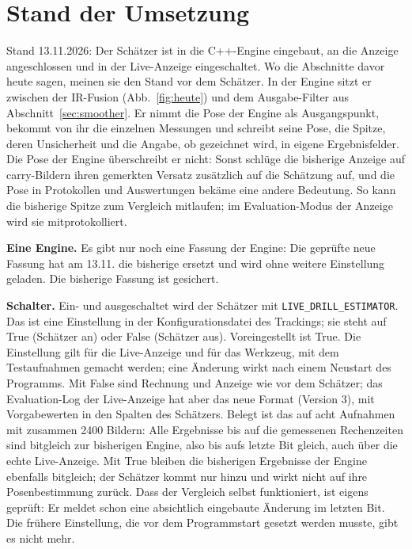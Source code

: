 \documentclass[11pt,a4paper,fleqn]{article}
\begin{document}
\section{Stand der Umsetzung}
\label{sec:cpp}

Stand 13.11.2026: Der Schätzer ist in die C++-Engine eingebaut, an die Anzeige angeschlossen und in der
Live-Anzeige eingeschaltet. Wo die Abschnitte davor \glqq heute\grqq{} sagen, meinen sie den Stand vor dem Schätzer. In
der Engine sitzt er zwischen der IR-Fusion (Abb.~\ref{fig:heute}) und dem Ausgabe-Filter aus
Abschnitt~\ref{sec:smoother}. Er nimmt die Pose der Engine als Ausgangspunkt, bekommt von ihr die einzelnen Messungen
und schreibt seine Pose, die Spitze, deren Unsicherheit und die Angabe, ob gezeichnet wird, in eigene Ergebnisfelder.
Die Pose der Engine überschreibt er nicht: Sonst schlüge die bisherige Anzeige auf carry-Bildern ihren gemerkten
Versatz zusätzlich auf die Schätzung auf, und die Pose in Protokollen und Auswertungen bekäme eine andere Bedeutung. So
kann die bisherige Spitze zum Vergleich mitlaufen; im Evaluation-Modus der Anzeige wird sie mitprotokolliert.

\textbf{Eine Engine.} Es gibt nur noch eine Fassung der Engine: Die geprüfte neue Fassung hat am 13.11. die bisherige
ersetzt und wird ohne weitere Einstellung geladen. Die bisherige Fassung ist gesichert.

\textbf{Schalter.} Ein- und ausgeschaltet wird der Schätzer mit \texttt{LIVE\_DRILL\_ESTIMATOR}. Das ist eine
Einstellung in der Konfigurationsdatei des Trackings; sie steht auf True (Schätzer an) oder False (Schätzer aus).
Voreingestellt ist True. Die Einstellung gilt für die Live-Anzeige und für das Werkzeug, mit dem Testaufnahmen gemacht
werden; eine Änderung wirkt nach einem Neustart des Programms. Mit False sind Rechnung und Anzeige wie vor dem
Schätzer; das Evaluation-Log der Live-Anzeige hat aber das neue Format (Version 3), mit Vorgabewerten in den Spalten des Schätzers. Belegt
ist das auf acht Aufnahmen mit zusammen 2400 Bildern: Alle Ergebnisse bis auf die gemessenen Rechenzeiten sind
bitgleich zur bisherigen Engine, also bis aufs letzte Bit gleich, auch über die echte Live-Anzeige. Mit True bleiben
die bisherigen Ergebnisse der Engine ebenfalls bitgleich; der Schätzer kommt nur hinzu und wirkt nicht auf ihre
Posenbestimmung zurück. Dass der Vergleich selbst funktioniert, ist eigens geprüft: Er meldet schon eine absichtlich
eingebaute Änderung im letzten Bit. Die frühere Einstellung, die vor dem Programmstart gesetzt werden musste, gibt es
nicht mehr.
\end{document}
